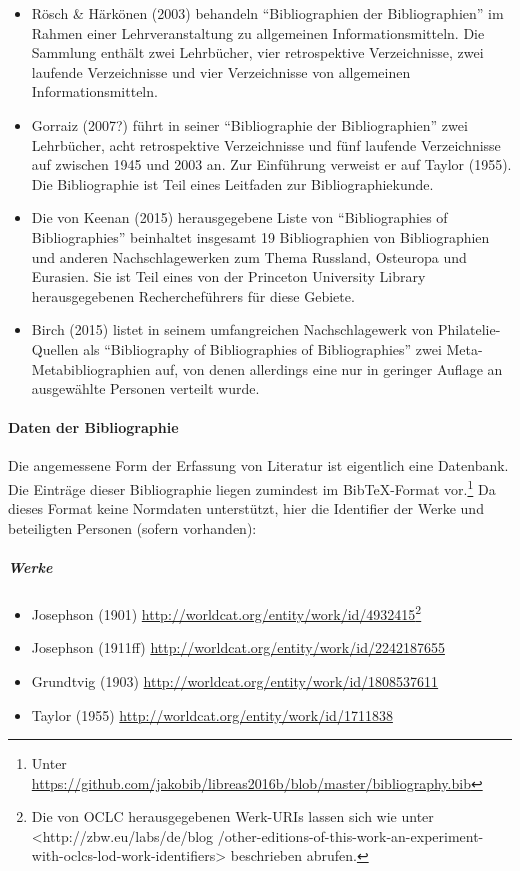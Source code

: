 \documentclass[a4paper,
fontsize=11pt,
oneside,
numbers=noperiodatend,
parskip=half-,
bibliography=totoc,
final
]{scrartcl}
\providecommand{\tightlist}{%
  \setlength{\itemsep}{0pt}\setlength{\parskip}{0pt}}
\begin{document}
\begin{itemize}
\item
  Rösch \& Härkönen (2003) behandeln \enquote{Bibliographien der
  Bibliographien} im Rahmen einer Lehrveranstaltung zu allgemeinen
  Informationsmitteln. Die Sammlung enthält zwei Lehrbücher, vier
  retrospektive Verzeichnisse, zwei laufende Verzeichnisse und vier
  Verzeichnisse von allgemeinen Informationsmitteln.
\item
  Gorraiz (2007?) führt in seiner \enquote{Bibliographie der
  Bibliographien} zwei Lehrbücher, acht retrospektive Verzeichnisse und
  fünf laufende Verzeichnisse auf zwischen 1945 und 2003 an. Zur
  Einführung verweist er auf Taylor (1955). Die Bibliographie ist Teil
  eines Leitfaden zur Bibliographiekunde.
\item
  Die von Keenan (2015) herausgegebene Liste von \enquote{Bibliographies
  of Bibliographies} beinhaltet insgesamt 19 Bibliographien von
  Bibliographien und anderen Nachschlagewerken zum Thema Russland,
  Osteuropa und Eurasien. Sie ist Teil eines von der Princeton
  University Library herausgegebenen Rechercheführers für diese Gebiete.
\item
  Birch (2015) listet in seinem umfangreichen Nachschlagewerk von
  Philatelie- Quellen als \enquote{Bibliography of Bibliographies of
  Bibliographies} zwei Meta- Metabibliographien auf, von denen
  allerdings eine nur in geringer Auflage an ausgewählte Personen
  verteilt wurde.
\end{itemize}

\paragraph{Daten der Bibliographie}\label{daten-der-bibliographie}

Die angemessene Form der Erfassung von Literatur ist eigentlich eine
Datenbank. Die Einträge dieser Bibliographie liegen zumindest im
BibTeX-Format vor.\footnote{Unter
  \url{https://github.com/jakobib/libreas2016b/blob/master/bibliography.bib}}
Da dieses Format keine Normdaten unterstützt, hier die Identifier der
Werke und beteiligten Personen (sofern vorhanden):

\subparagraph{Werke}\label{werke}

\begin{itemize}
\tightlist
\item
  Josephson (1901)
  \url{http://worldcat.org/entity/work/id/4932415}\footnote{Die von OCLC
    herausgegebenen Werk-URIs lassen sich wie unter
    \textless{}http://zbw.eu/labs/de/blog
    /other-editions-of-this-work-an-experiment-with-oclcs-lod-work-identifiers\textgreater{}
    beschrieben abrufen.}
\item
  Josephson (1911ff) \url{http://worldcat.org/entity/work/id/2242187655}
\item
  Grundtvig (1903) \url{http://worldcat.org/entity/work/id/1808537611}
\item
  Taylor (1955) \url{http://worldcat.org/entity/work/id/1711838}
\end{itemize}
\end{document}
